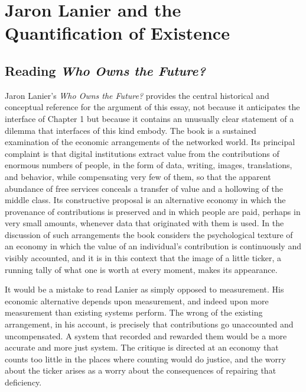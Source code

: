 \documentclass[11pt]{report}
\theoremstyle{definition}
\theoremstyle{remark}
\begin{document}
\chapter{Jaron Lanier and the Quantification of Existence}

\section{Reading \emph{Who Owns the Future?}}

Jaron Lanier's \emph{Who Owns the Future?} \cite{lanier} provides the central historical and conceptual reference for the argument of this essay, not because it anticipates the interface of Chapter 1 but because it contains an unusually clear statement of a dilemma that interfaces of this kind embody. The book is a sustained examination of the economic arrangements of the networked world. Its principal complaint is that digital institutions extract value from the contributions of enormous numbers of people, in the form of data, writing, images, translations, and behavior, while compensating very few of them, so that the apparent abundance of free services conceals a transfer of value and a hollowing of the middle class. Its constructive proposal is an alternative economy in which the provenance of contributions is preserved and in which people are paid, perhaps in very small amounts, whenever data that originated with them is used. In the discussion of such arrangements the book considers the psychological texture of an economy in which the value of an individual's contribution is continuously and visibly accounted, and it is in this context that the image of a little ticker, a running tally of what one is worth at every moment, makes its appearance.

It would be a mistake to read Lanier as simply opposed to measurement. His economic alternative depends upon measurement, and indeed upon more measurement than existing systems perform. The wrong of the existing arrangement, in his account, is precisely that contributions go unaccounted and uncompensated. A system that recorded and rewarded them would be a more accurate and more just system. The critique is directed at an economy that counts too little in the places where counting would do justice, and the worry about the ticker arises as a worry about the consequences of repairing that deficiency.
\end{document}

